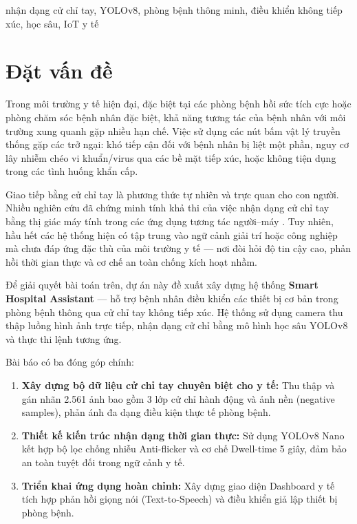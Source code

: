 \documentclass[conference]{IEEEtran}
\begin{document}
\begin{IEEEkeywords}
nhận dạng cử chỉ tay, YOLOv8, phòng bệnh thông minh, điều khiển không tiếp xúc, học sâu, IoT y tế
\end{IEEEkeywords}

\section{Đặt vấn đề}

Trong môi trường y tế hiện đại, đặc biệt tại các phòng bệnh hồi sức tích cực hoặc phòng chăm sóc bệnh nhân đặc biệt, khả năng tương tác của bệnh nhân với môi trường xung quanh gặp nhiều hạn chế. Việc sử dụng các nút bấm vật lý truyền thống gặp các trở ngại: khó tiếp cận đối với bệnh nhân bị liệt một phần, nguy cơ lây nhiễm chéo vi khuẩn/virus qua các bề mặt tiếp xúc, hoặc không tiện dụng trong các tình huống khẩn cấp.

Giao tiếp bằng cử chỉ tay là phương thức tự nhiên và trực quan cho con người. Nhiều nghiên cứu đã chứng minh tính khả thi của việc nhận dạng cử chỉ tay bằng thị giác máy tính trong các ứng dụng tương tác người--máy \cite{ref1}. Tuy nhiên, hầu hết các hệ thống hiện có tập trung vào ngữ cảnh giải trí hoặc công nghiệp mà chưa đáp ứng đặc thù của môi trường y tế --- nơi đòi hỏi độ tin cậy cao, phản hồi thời gian thực và cơ chế an toàn chống kích hoạt nhầm.

Để giải quyết bài toán trên, dự án này đề xuất xây dựng hệ thống \textbf{Smart Hospital Assistant} --- hỗ trợ bệnh nhân điều khiển các thiết bị cơ bản trong phòng bệnh thông qua cử chỉ tay không tiếp xúc. Hệ thống sử dụng camera thu thập luồng hình ảnh trực tiếp, nhận dạng cử chỉ bằng mô hình học sâu YOLOv8 \cite{ref7} và thực thi lệnh tương ứng.

Bài báo có ba đóng góp chính:

\begin{enumerate}
    \item \textbf{Xây dựng bộ dữ liệu cử chỉ tay chuyên biệt cho y tế:} Thu thập và gán nhãn 2.561 ảnh bao gồm 3 lớp cử chỉ hành động và ảnh nền (negative samples), phản ánh đa dạng điều kiện thực tế phòng bệnh.
    \item \textbf{Thiết kế kiến trúc nhận dạng thời gian thực:} Sử dụng YOLOv8 Nano kết hợp bộ lọc chống nhiễu Anti-flicker và cơ chế Dwell-time 5 giây, đảm bảo an toàn tuyệt đối trong ngữ cảnh y tế.
    \item \textbf{Triển khai ứng dụng hoàn chỉnh:} Xây dựng giao diện Dashboard y tế tích hợp phản hồi giọng nói (Text-to-Speech) và điều khiển giả lập thiết bị phòng bệnh.
\end{enumerate}
\end{document}
